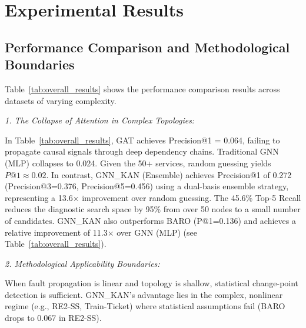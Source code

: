 \documentclass[conference]{IEEEtran}
\begin{document}
\section{Experimental Results}

\subsection{Performance Comparison and Methodological Boundaries}

Table~\ref{tab:overall_results} shows the performance comparison results across datasets of varying complexity.

\textit{1. The Collapse of Attention in Complex Topologies:} 

In Table~\ref{tab:overall_results}, GAT achieves Precision@1 = 0.064, failing to propagate causal signals through deep dependency chains. Traditional GNN (MLP) collapses to 0.024. Given the 50+ services, random guessing yields $P@1 \approx 0.02$. In contrast, GNN\_KAN (Ensemble) achieves Precision@1 of 0.272 (Precision@3=0.376, Precision@5=0.456) using a dual-basis ensemble strategy, representing a 13.6$\times$ improvement over random guessing. The 45.6\% Top-5 Recall reduces the diagnostic search space by 95\% from over 50 nodes to a small number of candidates. GNN\_KAN also outperforms BARO (P@1=0.136) and achieves a relative improvement of 11.3$\times$ over GNN (MLP) (see Table~\ref{tab:overall_results}).

\textit{2. Methodological Applicability Boundaries:} 

When fault propagation is linear and topology is shallow, statistical change-point detection is sufficient. GNN\_KAN's advantage lies in the complex, nonlinear regime (e.g., RE2-SS, Train-Ticket) where statistical assumptions fail (BARO drops to 0.067 in RE2-SS).
\end{document}
